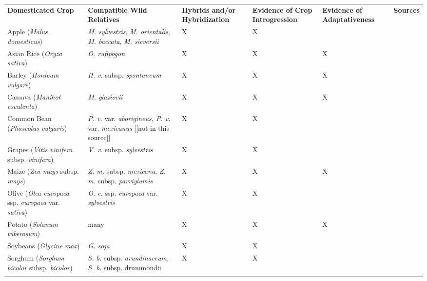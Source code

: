 \documentclass[11pt]{article}
\begin{document}
\begin{adjustbox}{angle=90}
        \small
    \begin{tabular}{G{3cm}G{3.5cm}G{3cm}G{3.5cm}G{3.5cm}G{2cm}}
    \\\toprule  
    {\bf Domesticated Crop}	& {\bf Compatible Wild Relatives } &	{\bf Hybrids and/or Hybridization} &  {\bf Evidence of Crop Introgression } &	{\bf Evidence of Adaptativeness} & {\bf Sources}\\ \midrule
Apple (\emph{Malus domesticus}) & \emph{M. sylvestris}, \emph{M. orientalis}, \emph{M. baccata}, \emph{M. sieversii}  & X & X & & \cite{cornille2012new} \\
Asian Rice (\emph{Oryza sativa}) & \emph{O. rufipogon} & X & X & X & \cite{Huang2012} \\ 
Barley (\emph{Hordeum vulgare}) & \emph{H. v.} subsp. \emph{spontaneum} & X & X & X & \cite{Poets2015} \\
Cassava (\emph{Manihot esculenta}) & \emph{M. glaziovii} & X & X & X & \cite{bredeson2016sequencing} \\
Common Bean (\emph{Phaseolus vulgaris}) & \emph{P. v.} var. \emph{aborigineus, P. v.} var. \emph{mexicanus} [[not in this source]]& X & X &  & \cite{papa2003asymmetry} \\
Grapes (\emph{Vitis vinifera} subsp. \emph{vinifera}) & \emph{V. v.} subsp. \emph{sylvestris} & X & X &  &  \cite{myles2011genetic} \\
Maize (\emph{Zea mays} subsp. \emph{mays}) & \emph{Z. m.} subsp. \emph{mexicana}, \emph{Z. m. } subsp. \emph{parviglumis} & X & X & X & \cite{Hufford2013} \\
Olive (\emph{Olea europaea} ssp. \emph{europaea} var. \emph{sativa}) & \emph{O. e.} ssp. \emph{europaea} var. \emph{sylvestris} & X & X & & \cite{diez2015olive} \\ 

Potato (\emph{Solanum tuberosum}) & many & X & X & X & \cite{hardigan2017genome}\\
Soybeans (\emph{Glycine max}) & \emph{G. soja} & X & X &  & \cite{lam2010resequencing} \\ 
 
Sorghum (\emph{Sorghum bicolor} subsp. \emph{bicolor}) & \emph{S. b.} subsp. \emph{arundinaceum, S. b.} subsp. {drummondii} & X & X &  & \cite{aldrich1992patterns} \\


\end{tabular}
\end{adjustbox}
\end{document}
